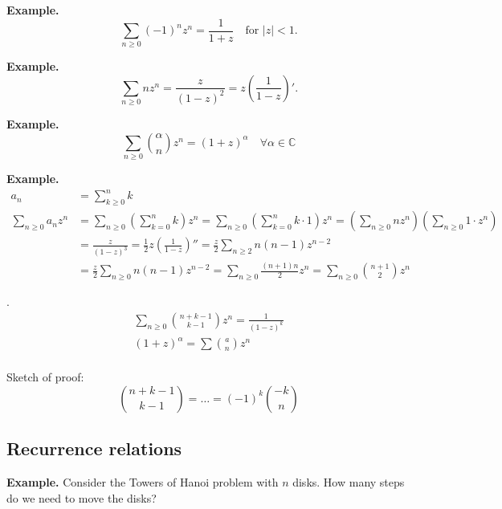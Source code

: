 \textbf{Example.}
\[
    \sum_{n≥0} (-1)^n z^n
    = \frac{1}{1+z} \quad\text{for $|z| < 1$}.
\]

\textbf{Example.}
\[
    \sum_{n≥0} n z^n
    = \frac{z}{(1-z)^2}
    = z \left(\frac1{1-z}\right)'.
\]

\textbf{Example.}
\[
    \sum_{n≥0} \binom{\alpha}{n} z^n
    = (1+z)^\alpha
    \quad\forall\alpha\in\mathbb{C}
\]

\textbf{Example.}
\begin{align*}
    a_n &= \sum_{k≥0}^n k\\
    \sum_{n≥0} a_n z^n
    &= \sum_{n≥0}
        \left(\sum_{k=0}^n k\right) z^n
    = \sum_{n≥0} \left(\sum_{k=0}^n  k\cdot 1\right) z^n
        = \left( \sum_{n≥0} n z^n \right) \left( \sum_{n≥0} 1 \cdot z^n \right)\\
    &= \frac{z}{(1-z)^3}
    = \frac12 z \left(\frac{1}{1-z}\right)''
    = \frac z2 \sum_{n≥2} n(n-1) z^{n-2}\\
    &= \frac z2 \sum_{n≥0} n(n-1) z^{n-2}
    = \sum_{n≥0} \frac{(n+1)n}{2} z^n
    = \sum_{n≥0} {\binom{n+1}{2}} z^n
\end{align*}

\Lemma.
\begin{gather*}
    \sum_{n≥0} {\binom{n+k-1}{k-1}} z^n
    = \frac1{(1-z)^k} \\
    (1 + z)^\alpha = \sum {\binom{a}{n}} z^n \\
\end{gather*}

Sketch of proof:
\[
    {\binom{n+k-1} {k-1}} = \ldots = (-1)^k{\binom{-k}{n}}
\]


\subsection{Recurrence relations}

\textbf{Example.}
Consider the Towers of Hanoi problem with $n$ disks. How many steps do we need to move the disks?

